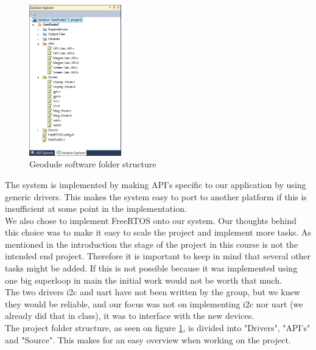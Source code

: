 \begin{figure}
\vspace{-30pt}
\begin{center}
\includegraphics[width=4cm]{billeder/folder_structure}
\end{center}
\vspace{-20pt}
\caption{Geodude software folder structure}
\vspace{-20pt}
\label{fig:fold_structure}
\end{figure}
The system is implemented by making API's specific to our application by using generic drivers. This makes the system easy to port to another platform if this is insufficient at some point in the implementation.\\
We also chose to implement FreeRTOS onto our system. Our thoughts behind this choice was to make it easy to scale the project and implement more tasks. As mentioned in the introduction the stage of the project in this course is not the intended end project. Therefore it is important to keep in mind that several other tasks might be added. If this is not possible because it was implemented using one big superloop in main the initial work would not be worth that much.\\%
The two drivers i2c and uart have not been written by the group, but we knew they would be reliable, and our focus was not on implementing i2c nor uart (we already did that in class), it was to interface with the new devices.\\
The project folder structure, as seen on figure \ref{fig:fold_structure}, is divided into "Drivers", "API's" and "Source". This makes for an easy overview when working on the project.\\

